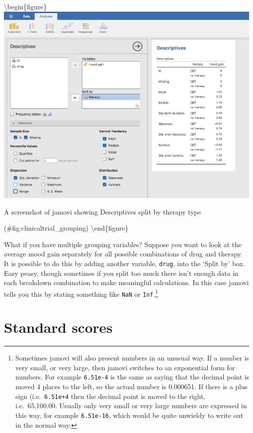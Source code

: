 \documentclass[
]{book}
\begin{document}
\textbackslash begin\{figure\}
\includegraphics[width=14.15in]{img/descriptives/clinicaltrial_grouping}

\caption{A screenshot of jamovi showing Descriptives split by therapy type}

(\#fig:clinicaltrial\_grouping)
\textbackslash end\{figure\}

What if you have multiple grouping variables? Suppose you want to look at the average mood gain separately for all possible combinations of drug and therapy. It is possible to do this by adding another variable, \texttt{drug}, into the `Split by' box. Easy peasy, though sometimes if you split too much there isn't enough data in each breakdown combination to make meaningful calculations. In this case jamovi tells you this by stating something like \texttt{NaN} or \texttt{Inf}.\footnote{Sometimes jamovi will also present numbers in an unusual way. If a number is very small, or very large, then jamovi switches to an exponential form for numbers. For example \texttt{6.51e-4} is the same as saying that the decimal point is moved 4 places to the left, so the actual number is 0.000651. If there is a plus sign (i.e.~\texttt{6.51e+4} then the decimal point is moved to the right, i.e.~65,100.00. Usually only very small or very large numbers are expressed in this way, for example \texttt{6.51e-16}, which would be quite unwieldy to write out in the normal way.}

\hypertarget{zscore}{%
\section{Standard scores}\label{zscore}}
\end{document}
